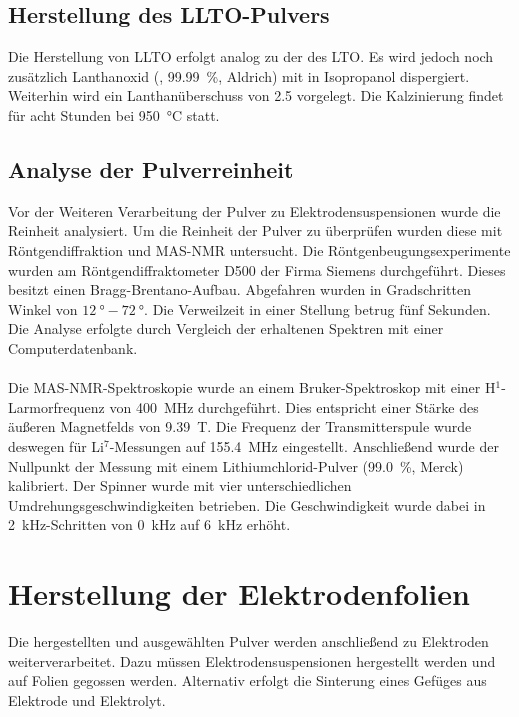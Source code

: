 \documentclass[a4paper, 11pt, headsepline,footsepline,twoside,abstract]{scrbook}
\begin{document}
\subsection{Herstellung des LLTO-Pulvers}
\label{praep_LLTO}
Die Herstellung von LLTO erfolgt analog zu der des LTO. Es wird jedoch noch zusätzlich Lanthanoxid (, \SI{99.99}{\percent}, Aldrich) mit in Isopropanol dispergiert. Weiterhin wird ein Lanthanüberschuss von \SI{2.5}{\masspercent} vorgelegt. Die Kalzinierung findet für acht Stunden bei \SI{950}{\celsius} statt.
\subsection{Analyse der Pulverreinheit}
\label{methode_analyse_pulver}
Vor der Weiteren Verarbeitung der Pulver zu Elektrodensuspensionen wurde die Reinheit analysiert. Um die Reinheit der Pulver zu überprüfen wurden diese mit Röntgendiffraktion und MAS-NMR untersucht. Die Röntgenbeugungsexperimente wurden am Röntgendiffraktometer D500 der Firma Siemens durchgeführt. Dieses besitzt einen Bragg-Brentano-Aufbau. Abgefahren wurden in Gradschritten Winkel von $\SI{12}{\degree} - \SI{72}{\degree}$. Die Verweilzeit in einer Stellung betrug fünf Sekunden. Die Analyse erfolgte durch Vergleich der erhaltenen Spektren mit einer Computerdatenbank.
\\\\
Die MAS-NMR-Spektroskopie wurde an einem Bruker-Spektroskop mit einer H$^1$-Larmor\-frequenz von \SI{400}{\mega\hertz} durchgeführt. Dies entspricht einer Stärke des äußeren Magnetfelds von \SI{9.39}{\tesla}. Die Frequenz der Transmitterspule wurde deswegen für Li$^7$-Messungen auf \SI{155.4}{\mega\hertz} eingestellt. Anschließend wurde der Nullpunkt der Messung mit einem Lithiumchlorid-Pulver (\SI{99.0}{\percent}, Merck) kalibriert. Der Spinner wurde mit vier unterschiedlichen Umdrehungsgeschwindigkeiten betrieben. Die Geschwindigkeit wurde dabei in \SI{2}{\kilo\hertz}-Schritten von \SI{0}{\kilo\hertz} auf \SI{6}{\kilo\hertz} erhöht.
\section{Herstellung der Elektrodenfolien}
Die hergestellten und ausgewählten Pulver werden anschließend zu Elektroden weiterverarbeitet. Dazu müssen Elektrodensuspensionen hergestellt werden und auf Folien gegossen werden. Alternativ erfolgt die Sinterung eines Gefüges aus Elektrode und Elektrolyt.
\end{document}
